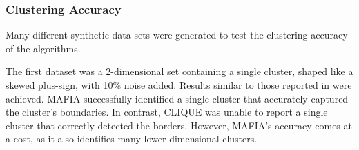 \subsubsection{Clustering Accuracy}
Many different synthetic data sets were generated to test the clustering accuracy of the algorithms.

The first dataset was a 2-dimensional set containing a single cluster, shaped like a skewed plus-sign, with 10\% noise added. Results similar to those reported in \cite{mafia} were achieved. MAFIA successfully identified a single cluster that accurately captured the cluster’s boundaries. In contrast, CLIQUE was unable to report a single cluster that correctly detected the borders. However, MAFIA’s accuracy comes at a cost, as it also identifies many lower-dimensional clusters.



